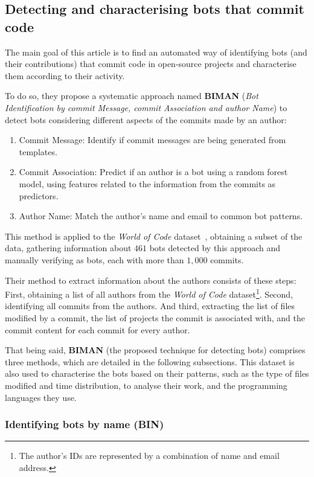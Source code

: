 \documentclass[a4paper, 12pt]{book}
\begin{document}
\subsection{Detecting and characterising bots that commit code}
\label{ssec:dey}

The main goal of this article is to find an automated way of identifying bots (and their contributions) that commit code in open-source projects and characterise them according to their activity.

To do so, they propose a systematic approach named \textbf{BIMAN} (\emph{Bot Identification by commit Message, commit Association and author Name}) to detect bots considering different aspects of the commits made by an author:
\begin{enumerate}
    \item Commit Message: Identify if commit messages are being generated from templates.
    \item Commit Association: Predict if an author is a bot using a random forest model, using features related to the information from the commits as predictors.
    \item Author Name: Match the author's name and email to common bot patterns.
\end{enumerate}

This method is applied to the \emph{World of Code} dataset~\cite{mockus-woc}, obtaining a subset of the data, gathering information about $461$ bots detected by this approach and manually verifying as bots, each with more than $1,000$ commits.

Their method to extract information about the authors consists of these steps: First, obtaining a list of all authors from the \emph{World of Code} dataset\footnote{The author's IDs are represented by a combination of name and email address.}. 
Second, identifying all commits from the authors. And third, extracting the list of files modified by a commit, the list of projects the commit is associated with, and the commit content for each commit for every author.

That being said, \textbf{BIMAN} (the proposed technique for detecting bots) comprises three methods, which are detailed in the following subsections. This dataset is also used to characterise the bots based on their patterns, such as the type of files modified and time distribution, to analyse their work, and the programming languages they use.

\subsubsection{Identifying bots by name (BIN)}
\label{sssec:dey-bin}
\end{document}
